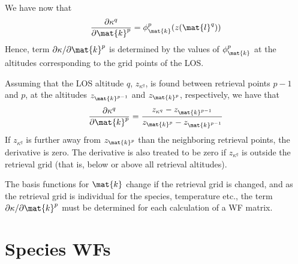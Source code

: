  We have now that
 \begin{equation}
   \frac{\partial \kappa^q}{\partial \mat{k}^p} = \phi^p_\mat{k}(z(\mat{l}^q))
  \label{eq:wfuns:kappak}
 \end{equation}
 Hence, term $\partial\kappa/ \partial \mat{k}^p$ is determined by the
 values of $\phi^p_\mat{k}$ at the altitudes corresponding to the grid
 points of the LOS.
 
 Assuming that the LOS altitude $q$, $z_{\kappa^q}$, is found between
 retrieval points $p-1$ and $p$, at the altitudes $z_{\mat{k}^{p-1}}$ and 
 $z_{\mat{k}^p}$, respectively, we have that
 \begin{equation}
   \frac{\partial \kappa^q}{\partial \mat{k}^p} =
   \frac{z_{\kappa^q}-z_{\mat{k}^{p-1}}}{z_{\mat{k}^{p}}-z_{\mat{k}^{p-1}}}
  \label{eq:wfuns:zz}
 \end{equation}
 If $z_{\kappa^q}$ is further away from $z_{\mat{k}^p}$ than the neighboring
 retrieval points, the derivative is zero. The derivative is also treated to 
 be zero if $z_{\kappa^q}$ is outside the retrieval grid (that is, below
 or above all retrieval altitudes).

 The basis functions for $\mat{k}$ change if the retrieval grid is
 changed, and as the retrieval grid is individual for the species, 
 temperature etc., the term $\partial\kappa/ \partial \mat{k}^p$ 
 must be determined for each calculation of a WF matrix.


\section{Species WFs}
 \label{sec:wfuns:species}
 
